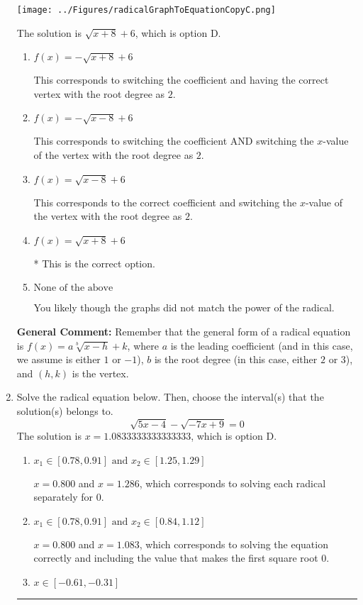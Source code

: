 \documentclass{extbook}[14pt]
\newcommand{\litem}[1]{\item #1

\rule{\textwidth}{0.4pt}}
\begin{document}
\begin{enumerate}
{\begin{center}
    \texttt{[image: ../Figures/radicalGraphToEquationCopyC.png]}
\end{center}


The solution is \( \sqrt{x + 8} + 6 \), which is option D.\begin{enumerate}[label=\Alph*.]
\item \( f(x) = - \sqrt{x + 8} + 6 \)

This corresponds to switching the coefficient and having the correct vertex with the root degree as $2$.
\item \( f(x) = - \sqrt{x - 8} + 6 \)

This corresponds to switching the coefficient AND switching the $x$-value of the vertex with the root degree as $2$.
\item \( f(x) = \sqrt{x - 8} + 6 \)

This corresponds to the correct coefficient and switching the $x$-value of the vertex with the root degree as $2$.
\item \( f(x) = \sqrt{x + 8} + 6 \)

* This is the correct option.
\item \( \text{None of the above} \)

You likely though the graphs did not match the power of the radical.
\end{enumerate}

\textbf{General Comment:} Remember that the general form of a radical equation is $ f(x) = a \sqrt[b]{x - h} + k$, where $a$ is the leading coefficient (and in this case, we assume is either $1$ or $-1$), $b$ is the root degree (in this case, either $2$ or $3$), and $(h, k)$ is the vertex.
}
\litem{
Solve the radical equation below. Then, choose the interval(s) that the solution(s) belongs to.
\[ \sqrt{5 x - 4} - \sqrt{-7 x + 9} = 0 \]The solution is \( x = 1.0833333333333333 \), which is option D.\begin{enumerate}[label=\Alph*.]
\item \( x_1 \in [0.78, 0.91] \text{ and } x_2 \in [1.25,1.29] \)

$x = 0.800$ and $x = 1.286$, which corresponds to solving each radical separately for 0.
\item \( x_1 \in [0.78, 0.91] \text{ and } x_2 \in [0.84,1.12] \)

$x = 0.800$ and $x = 1.083$, which corresponds to solving the equation correctly and including the value that makes the first square root 0.
\item \( x \in [-0.61,-0.31] \)


\end{enumerate}}
\end{enumerate}
\end{document}
